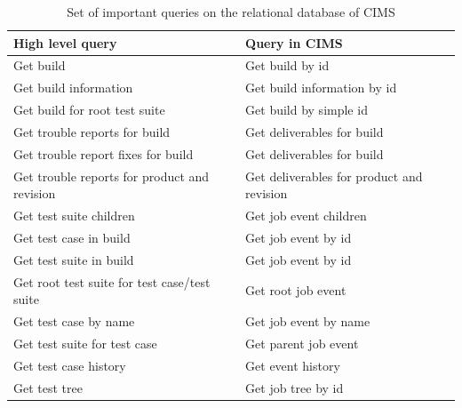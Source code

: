\begin{table}[h]
\begin{tabular}{|l|l|}
\hline
\textbf{High level query}                & \textbf{Query in CIMS}                    \\ \hline
Get build                                    & Get build by id                           \\ \hline
Get build information                        & Get build information by id               \\ \hline
Get build for root test suite                & Get build by simple id                    \\ \hline
Get trouble reports for build                & Get deliverables for build                \\ \hline
Get trouble report fixes for build           & Get deliverables for build                \\ \hline
Get trouble reports for product and revision & Get deliverables for product and revision \\ \hline
Get test suite children                      & Get job event children                    \\ \hline
Get test case in build                       & Get job event by id                       \\ \hline
Get test suite in build                      & Get job event by id                       \\ \hline
Get root test suite for test case/test suite & Get root job event                        \\ \hline
Get test case by name                        & Get job event by name                     \\ \hline
Get test suite for test case                 & Get parent job event                      \\ \hline
Get test case history                        & Get event history                         \\ \hline
Get test tree                                & Get job tree by id                        \\ \hline
\end{tabular}
\caption{Set of important queries on the relational database of CIMS}
\label{tab:queries}
\end{table}



%
%
